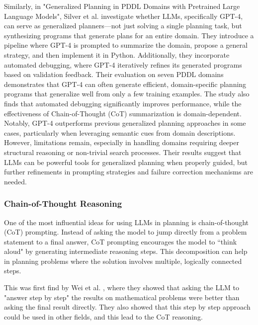 Similarly, in "Generalized Planning in PDDL Domains with Pretrained Large
Language Models", Silver et al. \cite{silver2023generalizedplanningpddldomains} investigate
whether LLMs, specifically GPT-4, can serve as generalized planners—not just solving
a single planning task, but synthesizing programs that generate plans for an
entire domain. They introduce a pipeline where GPT-4 is prompted to summarize the
domain, propose a general strategy, and then implement it in Python.
Additionally, they incorporate automated debugging, where GPT-4 iteratively
refines its generated programs based on validation feedback. Their evaluation on
seven PDDL domains demonstrates that GPT-4 can often generate efficient, domain-specific
planning programs that generalize well from only a few training examples. The study
also finds that automated debugging significantly improves performance, while
the effectiveness of Chain-of-Thought (CoT) summarization is domain-dependent. Notably,
GPT-4 outperforms previous generalized planning approaches in some cases, particularly
when leveraging semantic cues from domain descriptions. However, limitations remain,
especially in handling domains requiring deeper structural reasoning or non-trivial
search processes. Their results suggest that LLMs can be powerful tools for generalized
planning when properly guided, but further refinements in prompting strategies
and failure correction mechanisms are needed.

\subsubsection{Chain-of-Thought Reasoning}

One of the most influential ideas for using LLMs in planning is chain-of-thought
(CoT) prompting. Instead of asking the model to jump directly from a problem
statement to a final answer, CoT prompting encourages the model to ``think aloud"
by generating intermediate reasoning steps. This decomposition can help in planning
problems where the solution involves multiple, logically connected steps.

This was first find by Wei et al. \cite{wei2023chainofthoughtpromptingelicitsreasoning},
where they showed that asking the LLM to "answer step by step" the results on
mathematical problems were better than asking the final result directly. They also
showed that this step by step approach could be used in other fields, and this
lead to the CoT reasoning.

